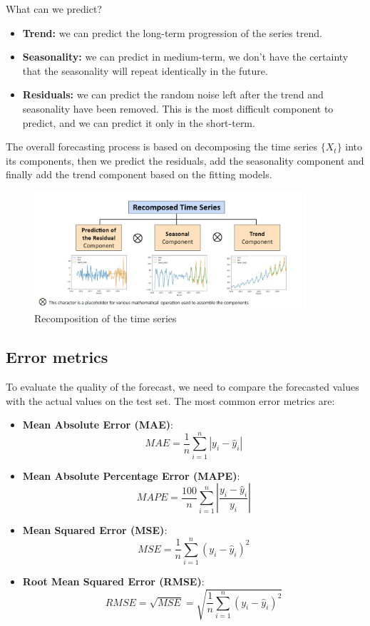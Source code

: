 What can we predict?
\begin{itemize}
    \item \textbf{Trend:} we can predict the long-term progression of the series trend.
    \item \textbf{Seasonality:} we can predict in medium-term, we don't have the certainty
    that the seasonality will repeat identically in the future.
    \item \textbf{Residuals:} we can predict the random noise left after the trend and
    seasonality have been removed. This is the most difficult component to predict, and
    we can predict it only in the short-term.
\end{itemize}

The overall forecasting process is based on decomposing the time series 
$\{X_t\}$ into its components, then we predict the residuals, add the seasonality
component and finally add the trend component based on the fitting models.

\begin{figure}[H]
    \centering
    \includegraphics[width=0.9\textwidth]{figures/recompose_time_series.png}
    \caption{Recomposition of the time series}
    \label{fig:recompose}
\end{figure}

\subsection{Error metrics}

To evaluate the quality of the forecast, we need to compare the forecasted values
with the actual values on the test set. The most common error metrics are:

\begin{itemize}
    \item \textbf{Mean Absolute Error (MAE)}:
    $$MAE = \frac{1}{n} \sum_{i=1}^n |y_i - \hat{y}_i|$$

    \item \textbf{Mean Absolute Percentage Error (MAPE)}:
    $$MAPE = \frac{100}{n} \sum_{i=1}^n \left| \frac{y_i - \hat{y}_i}{y_i} \right|$$

    \item \textbf{Mean Squared Error (MSE)}:
    $$MSE = \frac{1}{n} \sum_{i=1}^n (y_i - \hat{y}_i)^2$$

    \item \textbf{Root Mean Squared Error (RMSE)}:
    $$RMSE = \sqrt{MSE} = \sqrt{\frac{1}{n} \sum_{i=1}^n (y_i - \hat{y}_i)^2}$$
\end{itemize}

